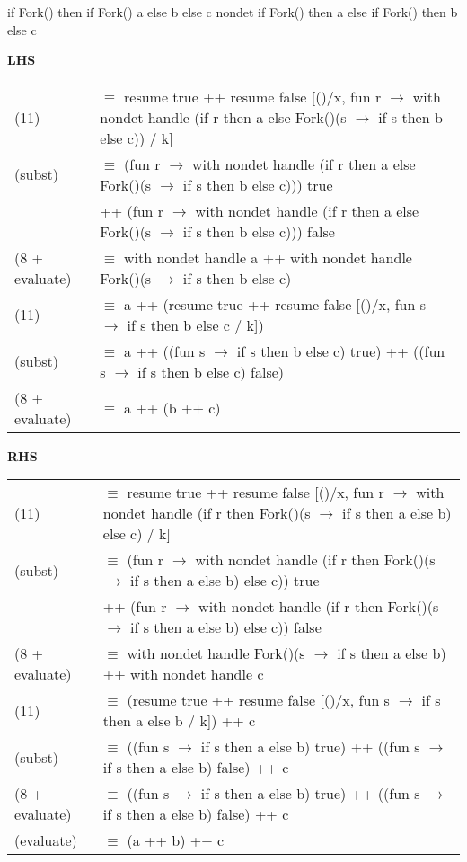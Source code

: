 \documentclass[logo,bsc,singlespacing,parskip]{infthesis}
\begin{document}
{
if Fork() then
if Fork() 
a 
else 
b 
else 
c
}
{nondet}
{
if Fork() then a 
else 
if Fork() 
 then b 
 else c
}

\noindent\textbf{LHS}
\begin{flushleft}
\renewcommand{\arraystretch}{1.3} %
\begin{tabularx}{\textwidth}{l X}
    (11) & $\equiv$ resume true ++ resume false [()/x, fun r $\rightarrow$ with nondet handle (if r then a else Fork()(s $\rightarrow$ if s then b else c)) / k] \\
    (subst) & $\equiv$ (fun r $\rightarrow$ with nondet handle (if r then a else Fork()(s $\rightarrow$ if s then b else c))) true \\
            & \quad ++ (fun r $\rightarrow$ with nondet handle (if r then a else Fork()(s $\rightarrow$ if s then b else c))) false \\
    (8 + evaluate) & $\equiv$ with nondet handle a ++ with nondet handle Fork()(s $\rightarrow$ if s then b else c) \\
    (11) & $\equiv$ a ++ (resume true ++ resume false [()/x, fun s $\rightarrow$ if s then b else c / k]) \\
    (subst) & $\equiv$ a ++ ((fun s $\rightarrow$ if s then b else c) true) ++ ((fun s $\rightarrow$ if s then b else c) false) \\
    (8 + evaluate) & $\equiv$ a ++ (b ++ c)
\end{tabularx}
\end{flushleft}

\noindent\textbf{RHS}

\begin{flushleft}
\renewcommand{\arraystretch}{1.3} %
\begin{tabularx}{\textwidth}{l X}
    (11) & $\equiv$ resume true ++ resume false [()/x, fun r $\rightarrow$ with nondet handle (if r then Fork()(s $\rightarrow$ if s then a else b) else c) / k] \\
    (subst) & $\equiv$ (fun r $\rightarrow$ with nondet handle (if r then Fork()(s $\rightarrow$ if s then a else b) else c)) true \\
            & \quad ++ (fun r $\rightarrow$ with nondet handle (if r then Fork()(s $\rightarrow$ if s then a else b) else c)) false \\
    (8 + evaluate) & $\equiv$ with nondet handle Fork()(s $\rightarrow$ if s then a else b) ++ with nondet handle c \\
    (11) & $\equiv$ (resume true ++ resume false [()/x, fun s $\rightarrow$ if s then a else b / k]) ++ c \\
    (subst) & $\equiv$ ((fun s $\rightarrow$ if s then a else b) true) ++ ((fun s $\rightarrow$ if s then a else b) false) ++ c \\
    (8 + evaluate) & $\equiv$ ((fun s $\rightarrow$ if s then a else b) true) ++ ((fun s $\rightarrow$ if s then a else b) false) ++ c \\
    (evaluate) & $\equiv$ (a ++ b) ++ c
\end{tabularx}
\end{flushleft}
\end{document}

